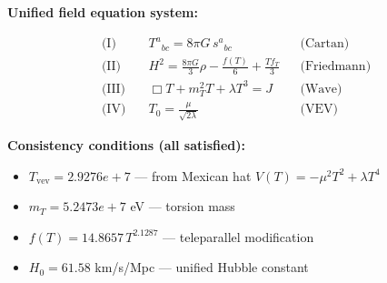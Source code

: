 
\textbf{Unified field equation system:}

\begin{align}
  \text{(I)} \quad & T^a{}_{bc} = 8\pi G \, s^a{}_{bc} && \text{(Cartan)} \\
  \text{(II)} \quad & H^2 = \frac{8\pi G}{3}\rho - \frac{f(T)}{6} + \frac{Tf_T}{3} && \text{(Friedmann)} \\
  \text{(III)} \quad & \Box T + m_T^2 T + \lambda T^3 = J && \text{(Wave)} \\
  \text{(IV)} \quad & T_0 = \frac{\mu}{\sqrt{2\lambda}} && \text{(VEV)}
\end{align}

\textbf{Consistency conditions (all satisfied):}
\begin{itemize}
  \item $T_{\text{vev}} = 2.9276e+7$ — from Mexican hat $V(T) = -\mu^2 T^2 + \lambda T^4$
  \item $m_T = 5.2473e+7$ eV — torsion mass
  \item $f(T) = 14.8657 \, T^{2.1287}$ — teleparallel modification
  \item $H_0 = 61.58$ km/s/Mpc — unified Hubble constant
\end{itemize}